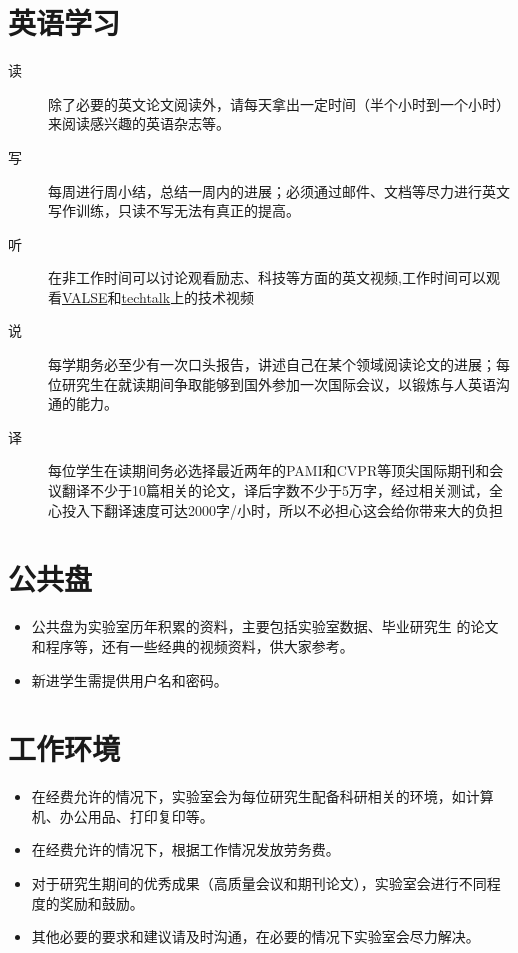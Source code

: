 \documentclass[a4paper，12pt]{article}
\begin{document}
\section{英语学习}

\begin{description}

\item[读] 除了必要的英文论文阅读外，请每天拿出一定时间（半个小时到一个小时）来阅读感兴趣的英语杂志等。

\item[写] 每周进行周小结，总结一周内的进展；必须通过邮件、文档等尽力进行英文写作训练，只读不写无法有真正的提高。

\item[听] 在非工作时间可以讨论观看励志、科技等方面的英文视频,工作时间可以观看\href{http://vision.ouc.edu.cn/valse/}{VALSE}和\href{http://techtalks.tv/}{techtalk}上的技术视频

\item[说] 每学期务必至少有一次口头报告，讲述自己在某个领域阅读论文的进展；每位研究生在就读期间争取能够到国外参加一次国际会议，以锻炼与人英语沟通的能力。

\item[译] 每位学生在读期间务必选择最近两年的PAMI和CVPR等顶尖国际期刊和会议翻译不少于10篇相关的论文，译后字数不少于5万字，经过相关测试，全心投入下翻译速度可达2000字/小时，所以不必担心这会给你带来大的负担

\end{description}

\section{公共盘}

\begin{itemize}

\item 公共盘为实验室历年积累的资料，主要包括实验室数据、毕业研究生
的论文和程序等，还有一些经典的视频资料，供大家参考。

\item 新进学生需提供用户名和密码。

\end{itemize}

\section{工作环境}

\begin{itemize}

\item 在经费允许的情况下，实验室会为每位研究生配备科研相关的环境，如计算机、办公用品、打印复印等。

\item 在经费允许的情况下，根据工作情况发放劳务费。

\item 对于研究生期间的优秀成果（高质量会议和期刊论文），实验室会进行不同程度的奖励和鼓励。

\item 其他必要的要求和建议请及时沟通，在必要的情况下实验室会尽力解决。

\end{itemize}
\end{document}
